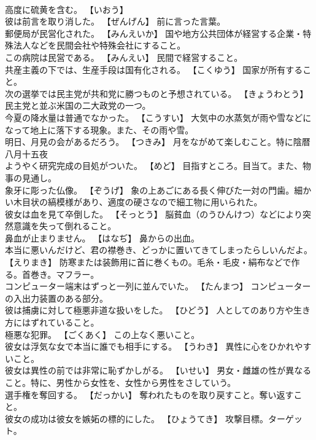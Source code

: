 \documentclass[8pt]{extreport}
\begin{document}
\begin{CJK}{UTF8}{min}
\\	高度に硫黄を含む。	【いおう】 
\\	彼は前言を取り消した。	【ぜんげん】 前に言った言葉。
\\	郵便局が民営化された。	【みんえいか】 国や地方公共団体が経営する企業・特殊法人などを民間会社や特殊会社にすること。
\\	この病院は民営である。	【みんえい】 民間で経営すること。
\\	共産主義の下では、生産手段は国有化される。	【こくゆう】 国家が所有すること。
\\	次の選挙では民主党が共和党に勝つものと予想されている。	【きょうわとう】 民主党と並ぶ米国の二大政党の一つ。
\\	今夏の降水量は普通でなかった。	【こうすい】 大気中の水蒸気が雨や雪などになって地上に落下する現象。また、その雨や雪。
\\	明日、月見の会があるだろう。	【つきみ】 月をながめて楽しむこと。特に陰暦八月十五夜
\\	ようやく研究完成の目処がついた。	【めど】 目指すところ。目当て。また、物事の見通し。
\\	象牙に彫った仏像。	【ぞうげ】 象の上あごにある長く伸びた一対の門歯。細かい木目状の縞模様があり、適度の硬さなので細工物に用いられた。
\\	彼女は血を見て卒倒した。	【そっとう】 脳貧血（のうひんけつ）などにより突然意識を失って倒れること。
\\	鼻血が止まりません。	【はなぢ】 鼻からの出血。
\\	本当に悪いんだけど、君の襟巻き、どっかに置いてきてしまったらしいんだよ。	【えりまき】 防寒または装飾用に首に巻くもの。毛糸・毛皮・絹布などで作る。首巻き。マフラー。
\\	コンピューター端末はずっと一列に並んでいた。	【たんまつ】 コンピューターの入出力装置のある部分。
\\	彼は捕虜に対して極悪非道な扱いをした。	【ひどう】 人としてのあり方や生き方にはずれていること。
\\	極悪な犯罪。	【ごくあく】 この上なく悪いこと。
\\	彼女は浮気な女で本当に誰でも相手にする。	【うわき】 異性に心をひかれやすいこと。
\\	彼女は異性の前では非常に恥ずかしがる。	【いせい】 男女・雌雄の性が異なること。特に、男性から女性を、女性から男性をさしていう。
\\	選手権を奪回する。	【だっかい】 奪われたものを取り戻すこと。奪い返すこと。
\\	彼女の成功は彼女を嫉妬の標的にした。	【ひょうてき】 攻撃目標。ターゲット。

\end{CJK}
\end{document}
